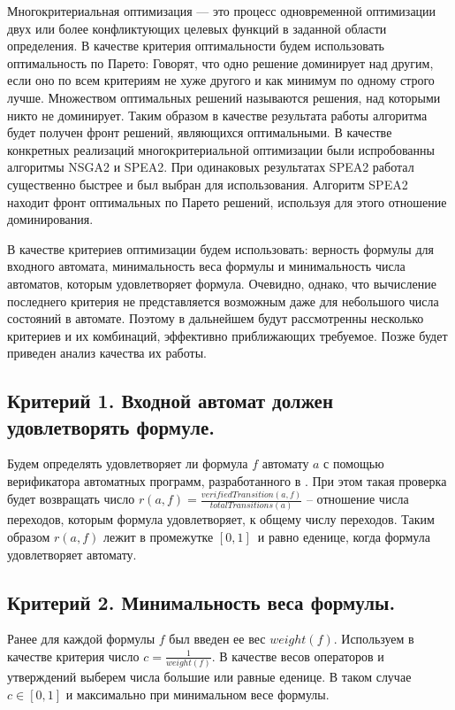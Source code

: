 \documentclass[12pt,fleqn]{article}
\begin{document}
Многокритериальная оптимизация --- это процесс одновременной оптимизации двух или более конфликтующих целевых функций
в заданной области определения. В качестве критерия оптимальности будем использовать оптимальность по Парето:
Говорят, что одно решение доминирует над другим, если оно по всем критериям не хуже другого и как минимум по одному
строго лучше. Множеством оптимальных решений называются решения, над которыми никто не доминирует. Таким образом
в качестве результата работы алгоритма будет получен фронт решений, являющихся оптимальными. В качестве конкретных
реализаций многокритериальной оптимизации были испробованны алгоритмы NSGA2\cite{nsga2} и SPEA2\cite{spea2}.
При одинаковых результатах SPEA2 работал существенно быстрее и был выбран для использования. Алгоритм SPEA2
находит фронт оптимальных по Парето решений, используя для этого отношение доминирования.

В качестве критериев оптимизации будем использовать: верность формулы для входного автомата, минимальность веса
формулы и минимальность числа автоматов, которым удовлетворяет формула. Очевидно, однако, что вычисление последнего
критерия не представляется возможным даже для небольшого числа состояний в автомате. Поэтому в дальнейшем будут
рассмотренны несколько критериев и их комбинаций, эффективно приближающих требуемое. Позже будет приведен
анализ качества их работы.

\subsection*{Критерий 1. Входной автомат должен удовлетворять формуле.}

Будем определять удовлетворяет ли формула $f$ автомату $a$ с помощью верификатора автоматных программ, разработанного в \cite{eg}.
При этом такая проверка будет возвращать число $r(a, f) = \frac{verifiedTransition(a, f)}{totalTransitions(a)}$ -- отношение числа
переходов, которым формула удовлетворяет, к общему числу переходов. Таким образом $r(a, f)$ лежит в промежутке $[0, 1]$\ и равно
еденице, когда формула удовлетворяет автомату.

\subsection*{Критерий 2. Минимальность веса формулы.}

Ранее для каждой формулы $f$ был введен ее вес $weight(f)$. Используем в качестве критерия число $c = \frac{1}{weight(f)}$.
В качестве весов операторов и утверждений выберем числа большие или равные еденице.
В таком случае $c \in [0, 1]$ и максимально при минимальном весе формулы.
\end{document}
